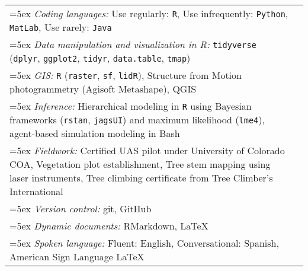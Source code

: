 \begin{longtable}{@{}>{\raggedright}p{6.25in} >{\raggedleft}X@{}}

\hangindent=5ex \emph{Coding languages:} Use regularly: \texttt{R}, Use infrequently: \texttt{Python}, \texttt{MatLab}, Use rarely: \texttt{Java} & \tabularnewline

\hangindent=5ex \emph{Data manipulation and visualization in R:} \texttt{tidyverse} (\texttt{dplyr}, \texttt{ggplot2}, \texttt{tidyr}, \texttt{data.table}, \texttt{tmap}) & \tabularnewline

\hangindent=5ex \emph{GIS:} \texttt{R} (\texttt{raster}, \texttt{sf}, \texttt{lidR}), Structure from Motion photogrammetry (Agisoft Metashape), QGIS & \tabularnewline


\hangindent=5ex \emph{Inference:} Hierarchical modeling in \texttt{R} using Bayesian frameworks (\texttt{rstan}, \texttt{jagsUI}) and maximum likelihood (\texttt{lme4}), agent-based simulation modeling in Bash  & \tabularnewline

\hangindent=5ex \emph{Fieldwork:} Certified UAS pilot under University of Colorado COA, Vegetation plot establishment, Tree stem mapping using laser instruments, Tree climbing certificate from Tree Climber's International & \tabularnewline

\hangindent=5ex \emph{Version control:} git, GitHub & \tabularnewline

\hangindent=5ex \emph{Dynamic documents:} RMarkdown, \LaTeX{} & \tabularnewline

\hangindent=5ex \emph{Spoken language:} Fluent: English, Conversational: Spanish, American Sign Language \LaTeX{} & \tabularnewline

\end{longtable}
